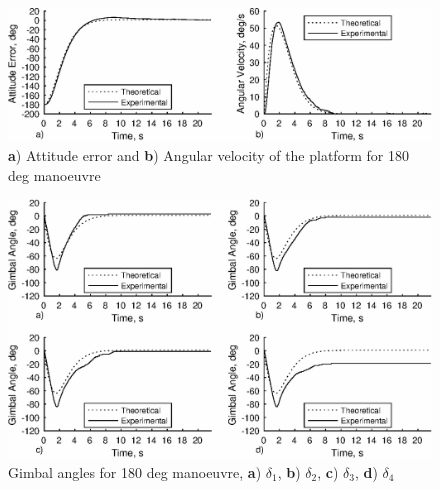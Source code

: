\documentclass[aerospace,article,submit,moreauthors,dvi2pdf]{Definitions/mdpi}
\begin{document}
\begin{figure}[H]
\includegraphics[width=13cm]{attitude.eps}
\caption{\textbf{a}) Attitude error and \textbf{b}) Angular velocity of the platform for 180 deg manoeuvre \label{fig:attitude}}
\end{figure}

\begin{figure}[H]
\includegraphics[width=13cm]{angles.eps}
\caption{Gimbal angles for 180 deg manoeuvre, \textbf{a}) $\delta_1$, \textbf{b}) $\delta_2$, \textbf{c}) $\delta_3$, \textbf{d}) $\delta_4$ \label{fig:angles}}
\end{figure}
\end{document}
